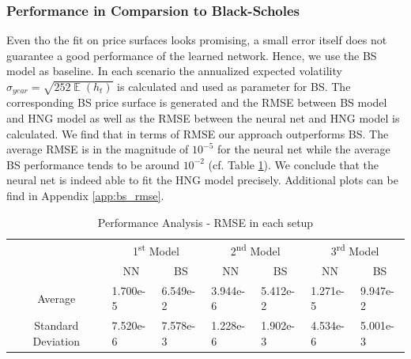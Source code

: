 \documentclass{article}
\DeclareMathOperator{\E}{\mathbb{E}}
\newcommand{\ts}{\textsuperscript}
\begin{document}
\subsubsection{Performance in Comparsion to Black-Scholes}\label{sec:bs_results}
Even tho the fit on price surfaces looks promising, a small error itself does not guarantee a good performance of the learned network. Hence, we use the BS model as baseline. In each scenario the annualized expected volatility $\sigma_{year}=\sqrt{252\E(h_t)}$ is calculated and used as parameter for BS. The corresponding BS price surface is generated and the RMSE between BS model and HNG model as well as the RMSE between the neural net and HNG model is calculated. We find that in terms of RMSE our approach outperforms BS. The average RMSE is in the magnitude of $10^{-5}$ for the neural net while the average BS performance tends to be around $10^{-2}$ (cf. Table \ref{tab:bs_rmse}). We conclude that the neural net is indeed able to fit the HNG model precisely. Additional plots can be find in Appendix \ref{app:bs_rmse}.
\begin{table}[!ht]
\centering
\begin{tabular}{|l|l|l|l|l|l|l|}
\hline
\multirow{2}{*}{} & \multicolumn{2}{c|}{1\ts{st} Model \footnotemark} & \multicolumn{2}{c|}{2\ts{nd} Model \footnotemark} & \multicolumn{2}{c|}{3\ts{rd} Model \footnotemark} \\ \cline{2-7} 
 & \multicolumn{1}{c|}{NN} & \multicolumn{1}{c|}{BS} & \multicolumn{1}{c|}{NN} & \multicolumn{1}{c|}{BS} & \multicolumn{1}{c|}{NN} & \multicolumn{1}{c|}{BS} \\ \hline
\multicolumn{1}{|c|}{Average} & 1.700e-5 & 6.549e-2 & 3.944e-6 & 5.412e-2 & 1.271e-5 & 9.947e-2 \\ \hline
\multicolumn{1}{|c|}{Standard Deviation} & 7.520e-6 & 7.578e-3 & 1.228e-6 & 1.902e-3 & 4.534e-6 & 5.001e-3 \\ \hline
\end{tabular}\label{tab:bs_rmse}\vspace{0.1cm}
\caption{Performance Analysis - RMSE in each setup}
\end{table}
\end{document}
